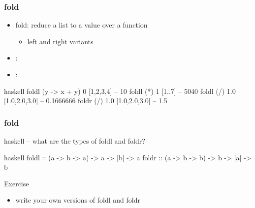 \documentclass[dvipsnames]{beamer}
\theoremstyle{plain}
\begin{document}
\begin{frame}[fragile]
  \frametitle{fold}

  \begin{itemize}
    \item fold: reduce a list to a value over a function
    \begin{itemize}
      \item left and right variants
    \end{itemize}

    \medskip
    \item {}:\\
    \item {}:\\
  \end{itemize}

  \pause
  \begin{example}[Haskell]
    \begin{pygments}{haskell}
foldl (\x y -> x + y) 0 [1,2,3,4]   -- 10
foldl (*) 1 [1..7]                  -- 5040
foldl (/) 1.0 [1.0,2.0,3.0]         -- 0.1666666
foldr (/) 1.0 [1.0,2.0,3.0]         -- 1.5
    \end{pygments}
  \end{example}
\end{frame}

\begin{frame}[fragile]
  \frametitle{fold}

  \begin{example}[Haskell]
    \begin{pygments}{haskell}
-- what are the types of foldl and foldr?
    \end{pygments}

    \pause
    \begin{pygments}{haskell}
foldl :: (a -> b -> a) -> a -> [b] -> a
foldr :: (a -> b -> b) -> b -> [a] -> b
    \end{pygments}
  \end{example}

  \pause
  \begin{block}{Exercise}
    \begin{itemize}
      \item write your own versions of foldl and foldr
    \end{itemize}
  \end{block}
\end{frame}
\end{document}
